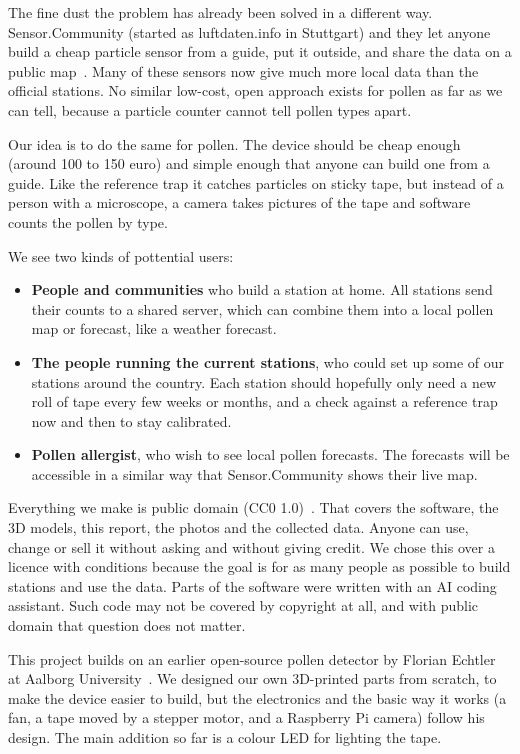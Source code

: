 The fine dust the problem has already been solved in a different way. Sensor.Community (started
as luftdaten.info in Stuttgart) and they let anyone build a cheap particle sensor from a guide, put it
outside, and share the data on a public map~\cite{SensorCommunity}. Many of these sensors
now give much more local data than the official stations. No similar low-cost, open approach
exists for pollen as far as we can tell, because a particle counter cannot tell pollen types apart.

Our idea is to do the same for pollen. The device should be cheap enough (around 100 to 150
euro) and simple enough that anyone can build one from a guide. Like the reference trap it
catches particles on sticky tape, but instead of a person with a microscope, a camera takes
pictures of the tape and software counts the pollen by type.

We see two kinds of pottential users:

\begin{itemize}
  \item \textbf{People and communities} who build a station at home. All stations send their
  counts to a shared server, which can combine them into a local pollen map or forecast, like a
  weather forecast.
  \item \textbf{The people running the current stations}, who could set up some of our stations
  around the country. Each station should hopefully only need a new roll of tape every few weeks or months,
  and a check against a reference trap now and then to stay calibrated.
  \item \textbf{Pollen allergist}, who wish to see local pollen forecasts. The forecasts will be accessible in a similar way that Sensor.Community shows their live map. 
\end{itemize}

Everything we make is public domain (CC0 1.0)~\cite{CC0}. That covers the software, the 3D models, this report,
the photos and the collected data. Anyone can use, change or sell it without asking and without
giving credit. We chose this over a licence with conditions because the goal is for as many
people as possible to build stations and use the data. Parts of the software were written with
an AI coding assistant. Such code may not be covered by copyright at all, and with public domain
that question does not matter.

This project builds on an earlier open-source pollen detector by
Florian Echtler at Aalborg University~\cite{EchtlerPollen}. We designed our own 3D-printed parts from scratch,
to make the device easier to build, but the electronics and the basic way it works (a fan, a
tape moved by a stepper motor, and a Raspberry Pi camera) follow his design. The main
addition so far is a colour LED for lighting the tape.

